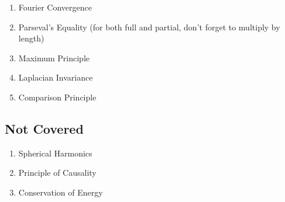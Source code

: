 \documentclass{article}
\newtheorem{one minute paper}[theorem]{One Minute Paper}
\begin{document}
\begin{enumerate}
    \item Fourier Convergence
    \item Parseval's Equality (for both full and partial, don't forget to multiply by length)
    \item Maximum Principle
    \item Laplacian Invariance
    \item Comparison Principle
\end{enumerate}

\subsection*{Not Covered}

\begin{enumerate}
    \item Spherical Harmonics
    \item Principle of Causality
    \item Conservation of Energy
\end{enumerate}
\end{document}
